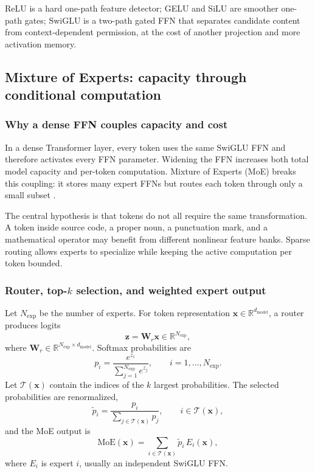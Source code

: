 \documentclass[11pt,a4paper]{article}
\theoremstyle{definition}
\theoremstyle{plain}
\newcommand{\vx}{\bm{x}}
\newcommand{\vz}{\bm{z}}
\newcommand{\mW}{\bm{W}}
\newcommand{\reals}{\mathbb{R}}
\newcommand{\dmodel}{d_{\mathrm{model}}}
\begin{document}
\begin{connectionbox}
ReLU is a hard one-path feature detector; GELU and SiLU are smoother one-path gates; SwiGLU is a two-path gated FFN that separates candidate content from context-dependent permission, at the cost of another projection and more activation memory.
\end{connectionbox}

\subsection{Mixture of Experts: capacity through conditional computation}
\label{sec:moe}

\subsubsection{Why a dense FFN couples capacity and cost}

In a dense Transformer layer, every token uses the same SwiGLU FFN and therefore activates every FFN parameter. Widening the FFN increases both total model capacity and per-token computation. Mixture of Experts (MoE) breaks this coupling: it stores many expert FFNs but routes each token through only a small subset \cite{fedus2022switch,jiang2024mixtral}.

The central hypothesis is that tokens do not all require the same transformation. A token inside source code, a proper noun, a punctuation mark, and a mathematical operator may benefit from different nonlinear feature banks. Sparse routing allows experts to specialize while keeping the active computation per token bounded.

\subsubsection{Router, top-$k$ selection, and weighted expert output}

Let $N_{\mathrm{exp}}$ be the number of experts. For token representation $\vx\in\reals^{\dmodel}$, a router produces logits
\begin{equation}
    \vz=\mW_r\vx\in\reals^{N_{\mathrm{exp}}},
\end{equation}
where $\mW_r\in\reals^{N_{\mathrm{exp}}\times\dmodel}$. Softmax probabilities are
\begin{equation}
    p_i=\frac{e^{z_i}}{\sum_{j=1}^{N_{\mathrm{exp}}}e^{z_j}},
    \qquad i=1,\ldots,N_{\mathrm{exp}}.
\end{equation}
Let $\mathcal{T}(\vx)$ contain the indices of the $k$ largest probabilities. The selected probabilities are renormalized,
\begin{equation}
    \widetilde p_i
    =\frac{p_i}{\sum_{j\in\mathcal{T}(\vx)}p_j},
    \qquad i\in\mathcal{T}(\vx),
\end{equation}
and the MoE output is
\begin{equation}\label{eq:moe-output-full}
    \mathrm{MoE}(\vx)
    =\sum_{i\in\mathcal{T}(\vx)}
      \widetilde p_i\,E_i(\vx),
\end{equation}
where $E_i$ is expert $i$, usually an independent SwiGLU FFN.
\end{document}
